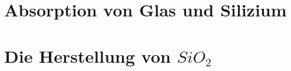 
\section{Absorption von Glas und Silizium}
\label{sec:absorption}

\section{Die Herstellung von $SiO_2$}
\label{sec:sio2}